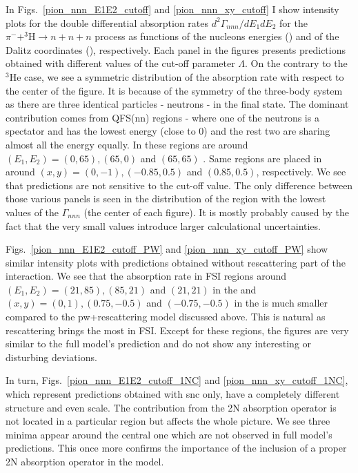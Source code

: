     In Figs.~\ref{pion_nnn_E1E2_cutoff} and \ref{pion_nnn_xy_cutoff} I show intensity plots for the double differential absorption rates
    $d^2 \Gamma_{nnn}/dE_1dE_2$ for the $\pi^- + ^3\text{H} \rightarrow n + n + n$ process as functions of the nucleons energies
    () and of the Dalitz coordinates (), respectively.
    Each panel in the figures presents predictions obtained with different values of the cut-off parameter $\Lambda$.
    On the contrary to the $^3$He case, we see a symmetric distribution of the absorption rate with respect to the
    center of the figure.
    It is because of the symmetry of the three-body system as there are
    three identical particles - neutrons - in the final state.
    The dominant contribution comes from QFS(nn) regions - where one of the neutrons is a spectator and has the lowest energy (close to 0)
    and the rest two are sharing almost all the energy equally.
    In  these regions are around $(E_1, E_2) = (0, 65), (65, 0)$ and $(65, 65)$ \SI{}{\mev}.
    Same regions are placed in  around $(x, y) = (0, -1), (-0.85, 0.5)$ and $(0.85, 0.5)$, respectively.
    We see that predictions are not sensitive to the cut-off value.
    The only difference between those various panels is seen in the distribution of the region with the lowest values of 
    the $\Gamma_{nnn}$ (the center of each figure). It is mostly probably caused by the fact that
    the very small values introduce larger calculational uncertainties.

    Figs.~\ref{pion_nnn_E1E2_cutoff_PW} and \ref{pion_nnn_xy_cutoff_PW} show similar intensity plots 
    with predictions obtained without rescattering part of the interaction.
    We see that the absorption rate in FSI regions around $(E_1, E_2) = (21, 85), (85, 21)$ and $(21, 21)$ \SI{}{\mev} in 
    the 
    and $(x, y) = (0, 1), (0.75, -0.5)$ and $(-0.75, -0.5)$ in the 
    is much smaller compared to the \gls{pw}+rescattering model discussed above.
    This is natural as rescattering brings the most in FSI. 
    Except for these regions, the figures are very similar to the full model's prediction and do not show 
    any interesting or disturbing deviations.

    In turn, Figs.~\ref{pion_nnn_E1E2_cutoff_1NC} and \ref{pion_nnn_xy_cutoff_1NC}, 
    which represent predictions obtained with \gls{snc} only, have a completely
    different structure and even scale. The contribution from the 2N absorption operator is not 
    located in a particular region but affects the whole picture.
    We see three minima appear around the central one which are not observed 
    in full model's predictions.
    This once more confirms the importance of the inclusion of a proper 2N absorption operator in the model. 

